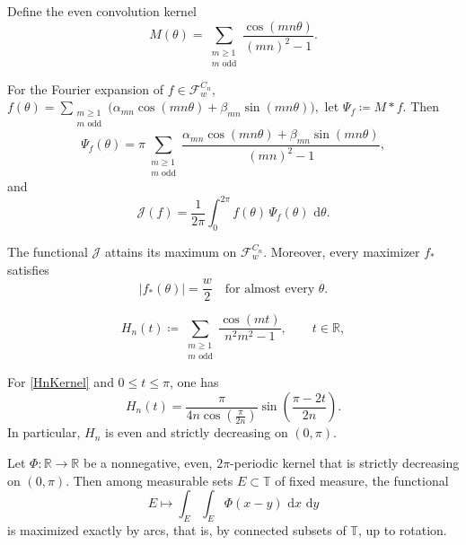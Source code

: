 \documentclass[10pt,a4paper]{amsart}
\newcommand{\dd}{\,\mathrm{d}}
\begin{document}
\begin{proposition}
\label{prop:objective-kernel}
Define the even convolution kernel
\begin{equation} \label{K}
M(\theta) = \sum_{\substack{m\ge1\\m\text{ odd}}}\frac{\cos(mn\theta)}{(mn)^2-1}.  
\end{equation}

For the Fourier expansion of $f\in \mathcal F_w^{C_n}$,
$
f(\theta)=\sum_{\substack{m\ge1\\ m\text{ odd}}}\bigl(\alpha_{mn}\cos(mn\theta)+\beta_{mn}\sin(mn\theta)\bigr),
$
 let $\Psi_f\coloneqq M*f$. Then
\[
\Psi_f(\theta)=\pi \sum_{\substack{m\ge1\\m\text{ odd}}} \frac{\alpha_{mn}\cos (mn\theta) + \beta_{mn}\sin (mn\theta)}{(mn)^2-1},
\]
and
\begin{equation}\label{II}
    \mathcal J(f) = \frac{1}{2\pi}\int_0^{2\pi} f(\theta)\,\Psi_f(\theta)\,\dd\theta.
\end{equation}


\end{proposition}

\begin{proposition}
\label{prop:bang-bang-maximizer}
The functional $\mathcal J$ attains its maximum on $\mathcal F_w^{C_n}$. Moreover, every maximizer $f_*$ satisfies
\[
|f_*(\theta)|=\frac w2 \quad\text{for almost every }\theta.
\]
\end{proposition}

\begin{equation}
\label{HnKernel}
H_n(t)\coloneqq \sum_{\substack{m\ge1\\m\text{ odd}}}\frac{\cos(mt)}{n^2m^2-1},
\qquad t\in\mathbb R,
\end{equation}

\begin{lemma}\label{lem:Hn-kernel}
For \eqref{HnKernel} and $0\le t\le \pi$, one has
\[
H_n(t)=\frac{\pi}{4n\cos\!\left(\frac{\pi}{2n}\right)}\sin\!\left(\frac{\pi-2t}{2n}\right).
\]
In particular, $H_n$ is even and strictly decreasing on $(0,\pi)$.
\end{lemma}

\begin{lemma}
\label{lem:circle-rearrangement}
Let $\Phi:\mathbb R\to\mathbb R$ be a nonnegative, even, $2\pi$-periodic kernel that is strictly decreasing on $(0,\pi)$. Then among measurable sets $E\subset\mathbb T$ of fixed measure, the functional
\[
E\longmapsto \int_E\int_E \Phi(x-y)\,\dd x\,\dd y
\]
is maximized exactly by arcs, that is, by connected subsets of $\mathbb T$, up to rotation.
\end{lemma}
\end{document}
